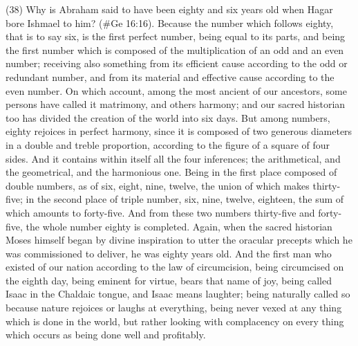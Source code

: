 (38) Why is Abraham said to have been eighty and six years old when Hagar bore Ishmael to him?
(\#Ge 16:16). Because the number which follows eighty, that is to say six, is the first perfect
number, being equal to its parts, and being the first number which is composed of the multiplication
of an odd and an even number; receiving also something from its efficient cause according to the
odd or redundant number, and from its material and effective cause according to the even number.
On which account, among the most ancient of our ancestors, some persons have called it
matrimony, and others harmony; and our sacred historian too has divided the creation of the world
into six days. But among numbers, eighty rejoices in perfect harmony, since it is composed of two
generous diameters in a double and treble proportion, according to the figure of a square of four
sides. And it contains within itself all the four inferences; the arithmetical, and the geometrical, and
the harmonious one. Being in the first place composed of double numbers, as of six, eight, nine,
twelve, the union of which makes thirty-five; in the second place of triple number, six, nine, twelve,
eighteen, the sum of which amounts to forty-five. And from these two numbers thirty-five and
forty-five, the whole number eighty is completed. Again, when the sacred historian Moses himself
began by divine inspiration to utter the oracular precepts which he was commissioned to deliver, he
was eighty years old. And the first man who existed of our nation according to the law of
circumcision, being circumcised on the eighth day, being eminent for virtue, bears that name of joy,
being called Isaac in the Chaldaic tongue, and Isaac means laughter; being naturally called so
because nature rejoices or laughs at everything, being never vexed at any thing which is done in
the world, but rather looking with complacency on every thing which occurs as being done well and
profitably.


